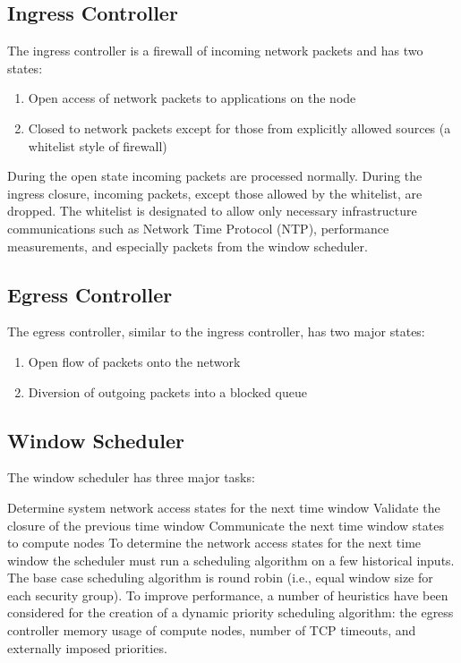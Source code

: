 \documentclass{article}
\begin{document}
 

\subsection{Ingress Controller}
The ingress controller is a firewall of incoming network packets and has two states:
\begin{enumerate} \itemsep1pt \parskip0pt 
\item Open access of network packets to applications on the node
\item Closed to network packets except for those from explicitly allowed sources (a whitelist style of firewall)
\end{enumerate}


During the open state incoming packets are processed normally. During the ingress closure, incoming packets, except those allowed by the whitelist, are dropped. The whitelist is designated to allow only necessary infrastructure communications such as Network Time Protocol (NTP), performance measurements, and especially packets from the window scheduler.
\subsection{Egress Controller}
The egress controller, similar to the ingress controller, has two major states:
\begin{enumerate} \itemsep1pt \parskip0pt 
\item Open flow of packets onto the network
\item Diversion of outgoing packets into a blocked queue
\end{enumerate}

\subsection{Window Scheduler}
The window scheduler has three major tasks: 

Determine system network access states for the next time window 
Validate the closure of the previous time window
Communicate the next time window states to compute nodes
To determine the network access states for the next time window the scheduler must run a scheduling algorithm on a few historical inputs. The base case scheduling algorithm is round robin (i.e., equal window size for each security group). To improve performance, a number of heuristics have been considered for the creation of a dynamic priority scheduling algorithm: the egress controller memory usage of compute nodes, number of TCP timeouts, and externally imposed priorities. 
\end{document}
